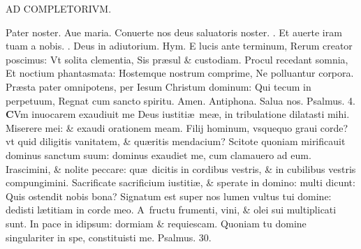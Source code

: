 \documentclass[a5paper,10pt]{book}
\def\ae{æ}
\begin{document}
\begin{multicols*}{2}
\begin{center}
AD COMPLETORIVM.
\end{center}
\vspace{-1em}
\par \noindent \color{red} P\color{black}ater noster. Aue maria. Conuerte nos deus saluatoris noster. \color{red} \Rbar . \color{black} Et auerte iram tuam a nobis. \color{red} \Vbar . \color{black} Deus in adiutorium. \color{red} Hym. \color{black}
E lucis ante terminum, Rerum creator poscimus: Vt solita clementia, Sis pr\ae sul \& custodiam.
\newline \color{red} P\color{black}rocul recedant somnia, Et noctium phantasmata: Hostemque nostrum comprime, Ne polluantur corpora.
\newline \color{red} P\color{black}r\ae sta pater omnipotens, per Iesum Christum dominum: Qui tecum in perpetuum, Regnat cum sancto spiritu. Amen.
\newline \color{red} Antiphona. \color{black} Salua nos. \color{red} Psalmus. 4. \color{black}
\lettrine[lines=2]{\bfseries \color{red} C}{}Vm inuocarem exaudiuit me Deus iustiti\ae \ me\ae , in tribulatione dilatasti mihi.
\newline \color{red} M\color{black}iserere mei: \& exaudi orationem meam.
\newline \color{red} F\color{black}ilij hominum, vsquequo graui corde? vt quid diligitis vanitatem, \& qu\ae ritis mendacium?
\newline \color{red} S\color{black}citote quoniam mirificauit dominus sanctum suum: dominus exaudiet me, cum clamauero ad eum.
\newline \color{red} I\color{black}rascimini, \& nolite peccare: qu\ae \ dicitis in cordibus vestris, \& in cubilibus vestris compungimini.
\newline \color{red} S\color{black}acrificate sacrificium iustiti\ae , \& sperate in domino: multi dicunt: Quis ostendit nobis bona?
\newline \color{red} S\color{black}ignatum est super nos lumen vultus tui domine: dedisti l\ae titiam in corde meo.
\newline \color{red} A\color{black}\ fructu frumenti, vini, \& olei sui multiplicati sunt.
\newline \color{red} I\color{black}n pace in idipsum: dormiam \& requiescam.
\newline \color{red} Q\color{black}uoniam tu domine singulariter in spe, constituisti me. \quad \color{red} Psalmus. 30. \color{black}

\end{multicols*}
\end{document}

